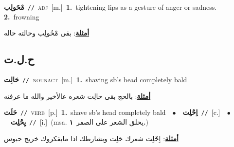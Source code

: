 \documentclass[10pt,a4paper,twoside]{article} %
\begin{document}
\begin{multicols}{2}
{\setlength\topsep{0pt}\textbf{\foreignlanguage{arabic}{مْحَولِب}}\ {\color{gray}\texttt{//}\color{black}}\ \textsc{adj}\ [m.]\ \textbf{1.}~tightening lips as a gesture of anger or sadness.  \textbf{2.}~frowning\  \begin{flushright}\color{gray}\foreignlanguage{arabic}{\textbf{\underline{\foreignlanguage{arabic}{أمثلة}}}: بقى مْحُولِب وحالته حاله}\end{flushright}\color{black}} \vspace{2mm}

\vspace{-3mm}
\subsection*{\color{blue}\foreignlanguage{arabic}{ح.ل.ت}\color{blue}{}} 

{\setlength\topsep{0pt}\textbf{\foreignlanguage{arabic}{حَالِت}}\ {\color{gray}\texttt{//}\color{black}}\ \textsc{noun\textunderscore act}\ [m.]\ \textbf{1.}~shaving sb's head completely bald\  \begin{flushright}\color{gray}\foreignlanguage{arabic}{\textbf{\underline{\foreignlanguage{arabic}{أمثلة}}}: بالحج بقى حالِت شعره عالأخير والله ما عرفته}\end{flushright}\color{black}} \vspace{2mm}

{\setlength\topsep{0pt}\textbf{\foreignlanguage{arabic}{حَلَت}}\ {\color{gray}\texttt{//}\color{black}}\ \textsc{verb}\ [p.]\ \textbf{1.}~shave sb's head completely bald\ \ $\bullet$\ \ \setlength\topsep{0pt}\textbf{\foreignlanguage{arabic}{اِحْلِت}}\ {\color{gray}\texttt{//}\color{black}}\ [c.]\ \ $\bullet$\ \ \setlength\topsep{0pt}\textbf{\foreignlanguage{arabic}{يِحْلِت}}\ {\color{gray}\texttt{//}\color{black}}\ [i.]\ \color{gray}(msa. \foreignlanguage{arabic}{يحلق الشعر على الصفر}~\foreignlanguage{arabic}{\textbf{١.}})\color{black}\  \begin{flushright}\color{gray}\foreignlanguage{arabic}{\textbf{\underline{\foreignlanguage{arabic}{أمثلة}}}: اِحْلِت شعرك حَلِت وبشارطك اذا مابفكروك خريج حبوس}\end{flushright}\color{black}} \vspace{2mm}


\end{multicols}
\end{document}
